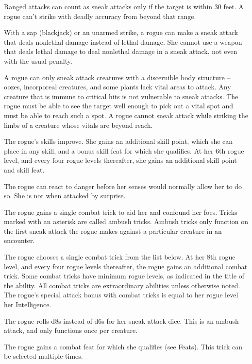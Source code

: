 \par Ranged attacks can count as sneak attacks only if the target is within 30 feet.
A rogue can't strike with deadly accuracy from beyond that range.

With a sap (blackjack) or an unarmed strike, a rogue can make a sneak attack that deals nonlethal damage instead of lethal damage.
She cannot use a weapon that deals lethal damage to deal nonlethal damage in a sneak attack, not even with the usual  penalty.

A rogue can only sneak attack creatures with a discernible body structure -- oozes, incorporeal creatures, and some plants lack vital areas to attack.
Any creature that is immune to critical hits is not vulnerable to sneak attacks.
The rogue must be able to see the target well enough to pick out a vital spot and must be able to reach such a spot.
A rogue cannot sneak attack while striking the limbs of a creature whose vitals are beyond reach.

The rogue's skills improve.
She gains an additional skill point, which she can place in any skill, and a bonus skill feat for which she qualifies.
At her 6th rogue level, and every four rogue levels thereafter, she gains an additional skill point and skill feat.

The rogue can react to danger before her senses would normally allow her to do so.
She is not \unaware when attacked by surprise.

The rogue gains a single combat trick to aid her and confound her foes.
Tricks marked with an asterisk are called ambush tricks.
Ambush tricks only function on the first sneak attack the rogue makes against a particular creature in an encounter.

The rogue chooses a single combat trick from the list below.
At her 8th rogue level, and every four rogue levels thereafter, the rogue gains an additional combat trick.
Some combat tricks have minimum rogue levels, as indicated in the title of the ability.
All combat tricks are extraordinary abilities unless otherwise noted.
The rogue's special attack bonus with combat tricks is equal to her rogue level \add her Intelligence.

The rogue rolls d8s instead of d6s for her sneak attack dice.
This is an ambush attack, and only functions once per creature.

The rogue gains a combat feat for which she qualifies (see Feats).
This trick can be selected multiple times.

